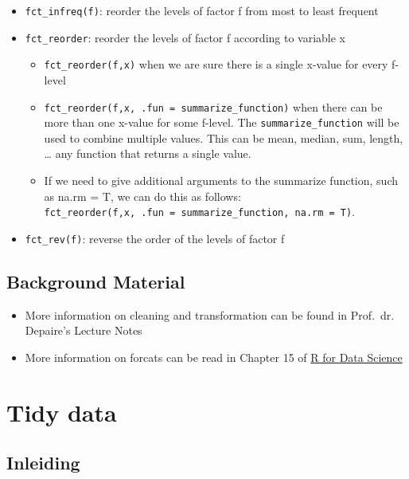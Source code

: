 \documentclass[]{tufte-book}
\providecommand{\tightlist}{%
  \setlength{\itemsep}{0pt}\setlength{\parskip}{0pt}}
\begin{document}
\begin{itemize}
\tightlist
\item
  \texttt{fct\_infreq(f)}: reorder the levels of factor f from most to least frequent
\item
  \texttt{fct\_reorder}: reorder the levels of factor f according to variable x

  \begin{itemize}
  \tightlist
  \item
    \texttt{fct\_reorder(f,x)} when we are sure there is a single x-value for every f-level
  \item
    \texttt{fct\_reorder(f,x,\ .fun\ =\ summarize\_function)} when there can be more than one x-value for some f-level. The \texttt{summarize\_function} will be used to combine multiple values. This can be mean, median, sum, length, \ldots{} any function that returns a single value.
  \item
    If we need to give additional arguments to the summarize function, such as na.rm = T, we can do this as follows: \texttt{fct\_reorder(f,x,\ .fun\ =\ summarize\_function,\ na.rm\ =\ T)}.
  \end{itemize}
\item
  \texttt{fct\_rev(f)}: reverse the order of the levels of factor f
\end{itemize}

\hypertarget{background-material-3}{%
\section{Background Material}\label{background-material-3}}

\begin{itemize}
\tightlist
\item
  More information on cleaning and transformation can be found in Prof.~dr. Depaire's Lecture Notes
\item
  More information on forcats can be read in Chapter 15 of \href{https://r4ds.had.co.nz/factors.html}{R for Data Science}
\end{itemize}

\hypertarget{tidy-data}{%
\chapter{Tidy data}\label{tidy-data}}

\hypertarget{inleiding}{%
\section{Inleiding}\label{inleiding}}
\end{document}
